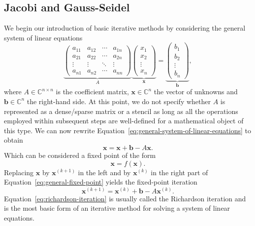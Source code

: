 \subsection{Jacobi and Gauss-Seidel} 
We begin our introduction of basic iterative methods by considering the general system of linear equations
\begin{equation}
	\underbrace{
	\begin{pmatrix}a_{11}&a_{12}&\cdots &a_{1n}\\a_{21}&a_{22}&\cdots &a_{2n}\\\vdots &\vdots &\ddots &\vdots \\a_{n1}&a_{n2}&\cdots &a_{nn}\end{pmatrix}}_{A}
\underbrace{\begin{pmatrix}
		x_1 \\ x_2 \\ \vdots \\ x_n
\end{pmatrix}}_{\bm{x}} = 
\underbrace{\begin{pmatrix}
		b_1 \\ b_2 \\ \vdots \\ b_n
\end{pmatrix}}_{\bm{b}},
	\label{eq:general-system-of-linear-equations}
\end{equation}
where $A \in \mathbb{C}^{n \times n}$ is the coefficient matrix, $\bm x \in \mathbb{C}^n$ the vector of unknowns and $\bm b \in \mathbb{C}^n$ the right-hand side.
At this point, we do not specify whether $A$ is represented as a dense/sparse matrix or a stencil as long as all the operations employed within subsequent steps are well-defined for a mathematical object of this type.
We can now rewrite Equation~\eqref{eq:general-system-of-linear-equations} to obtain
\begin{equation}
	\bm{x} = \bm{x} + \bm{b} - A \bm{x}.
	\label{eq:general-fixed-point}
\end{equation}
Which can be considered a fixed point of the form
\begin{equation}
	\bm x = f(\bm x).
\end{equation} 
Replacing $\bm x$ by $\bm{x}^{(k+1)}$ in the left and by $\bm{x}^{(k)}$ in the right part of Equation~\eqref{eq:general-fixed-point} yields the fixed-point iteration
\begin{equation}
	\bm{x}^{(k+1)} = \bm{x}^{(k)} + \bm b - A \bm{x}^{(k)}.
	\label{eq:richardson-iteration}
\end{equation}
Equation~\eqref{eq:richardson-iteration} is usually called the Richardson iteration and is the most basic form of an iterative method for solving a system of linear equations.
